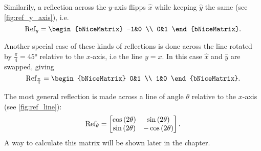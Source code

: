 \begin{descitemize}
		Similarily, a reflection across the $y$-axis flipps $\hat{x}$ while keeping $\hat{y}$ the same (see \autoref{fig:ref_y_axis}), i.e.
		\begin{equation}
			\Refl_{y} = \begin{bNiceMatrix} -1&0 \\ 0&1 \end{bNiceMatrix}. 
		\end{equation}
		
		Another special case of these kinds of reflections is done across the line rotated by $\frac{\pi}{4}=\ang{45}$ relative to the $x$-axis, i.e the line $y=x$. In this case $\hat{x}$ and $\hat{y}$ are swapped, giving
		\begin{equation}
			\Refl_{\frac{\pi}{4}} = \begin{bNiceMatrix} 0&1 \\ 1&0 \end{bNiceMatrix}. 
		\end{equation}

		The most general reflection is made across a line of angle $\theta$ relative to the $x$-axis (see \autoref{fig:ref_line}):
		\begin{equation}
			\text{Ref}_{\theta} = \begin{bmatrix} \cos \left( 2\theta \right) & \sin \left( 2\theta \right) \\ \sin \left( 2\theta \right) & -\cos \left( 2\theta \right) \end{bmatrix}.
			\label{eq:reflect_general_2x2}
		\end{equation}
		A way to calculate this matrix will be shown later in the chapter.


\end{descitemize}
